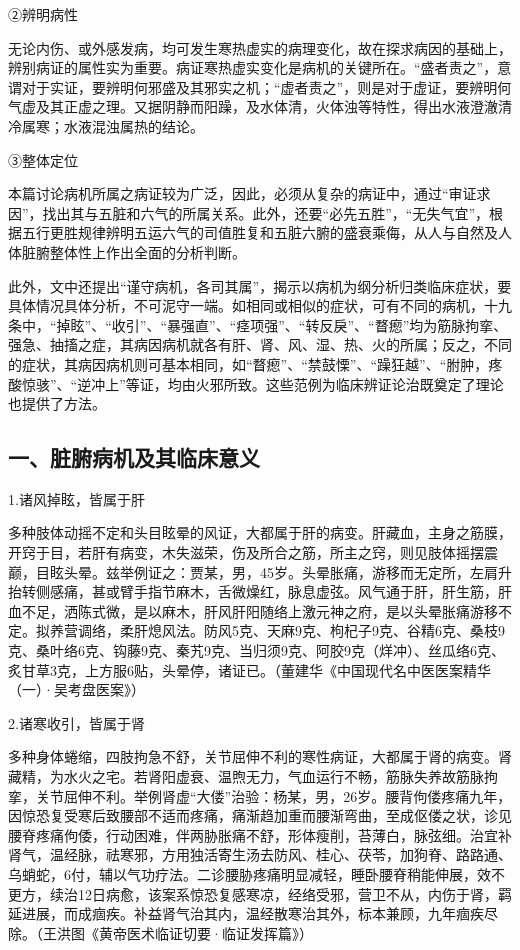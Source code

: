 \documentclass[draft,12pt]{ctexbook}
\begin{document}
②辨明病性

无论内伤、或外感发病，均可发生寒热虚实的病理变化，故在探求病因的基础上，辨别病证的属性实为重要。病证寒热虚实变化是病机的关键所在。“盛者责之”，意谓对于实证，要辨明何邪盛及其邪实之机；“虚者责之”，则是对于虚证，要辨明何气虚及其正虚之理。又据阴静而阳躁，及水体清，火体浊等特性，得出水液澄澈清冷属寒；水液混浊属热的结论。

③整体定位

本篇讨论病机所属之病证较为广泛，因此，必须从复杂的病证中，通过“审证求因”，找出其与五脏和六气的所属关系。此外，还要“必先五胜”，“无失气宜”，根据五行更胜规律辨明五运六气的司值胜复和五脏六腑的盛衰乘侮，从人与自然及人体脏腑整体性上作出全面的分析判断。

此外，文中还提出“谨守病机，各司其属”，揭示以病机为纲分析归类临床症状，要具体情况具体分析，不可泥守一端。如相同或相似的症状，可有不同的病机，十九条中，“掉眩”、“收引”、“暴强直”、“痉项强”、“转反戾”、“瞀瘛”均为筋脉拘挛、强急、抽搐之症，其病因病机就各有肝、肾、风、湿、热、火的所属；反之，不同的症状，其病因病机则可基本相同，如“瞀瘛”、“禁鼓慄”、“躁狂越”、“胕肿，疼酸惊骇”、“逆冲上”等证，均由火邪所致。这些范例为临床辨证论治既奠定了理论也提供了方法。


\subsection*{一、脏腑病机及其临床意义}

1.诸风掉眩，皆属于肝

多种肢体动摇不定和头目眩晕的风证，大都属于肝的病变。肝藏血，主身之筋膜，开窍于目，若肝有病变，木失滋荣，伤及所合之筋，所主之窍，则见肢体摇摆震巅，目眩头晕。兹举例证之：贾某，男，45岁。头晕胀痛，游移而无定所，左肩升抬转侧感痛，甚或臂手指节麻木，舌微燥红，脉息虚弦。风气通于肝，肝生筋，肝血不足，洒陈式微，是以麻木，肝风肝阳随络上激元神之府，是以头晕胀痛游移不定。拟养营调络，柔肝熄风法。防风5克、天麻9克、枸杞子9克、谷精6克、桑枝9克、桑叶络6克、钩藤9克、秦艽9克、当归须9克、阿胶9克（烊冲）、丝瓜络6克、炙甘草3克，上方服6贴，头晕停，诸证已。（董建华《中国现代名中医医案精华（一）·吴考盘医案》）

2.诸寒收引，皆属于肾

多种身体蜷缩，四肢拘急不舒，关节屈伸不利的寒性病证，大都属于肾的病变。肾藏精，为水火之宅。若肾阳虚衰、温煦无力，气血运行不畅，筋脉失养故筋脉拘挛，关节屈伸不利。举例肾虚“大偻”治验：杨某，男，26岁。腰背佝偻疼痛九年，因惊恐复受寒后致腰部不适而疼痛，痛渐趋加重而腰渐弯曲，至成伛偻之状，诊见腰脊疼痛佝倭，行动困难，伴两胁胀痛不舒，形体瘦削，苔薄白，脉弦细。治宜补肾气，温经脉，祛寒邪，方用独活寄生汤去防风、桂心、茯苓，加狗脊、路路通、乌蛸蛇，6付，辅以气功疗法。二诊腰胁疼痛明显减轻，睡卧腰脊稍能伸展，效不更方，续治12日病愈，该案系惊恐复感寒凉，经络受邪，营卫不从，内伤于肾，羁延进展，而成痼疾。补益肾气治其内，温经散寒治其外，标本兼顾，九年痼疾尽除。（王洪图《黄帝医术临证切要·临证发挥篇》）
\end{document}
